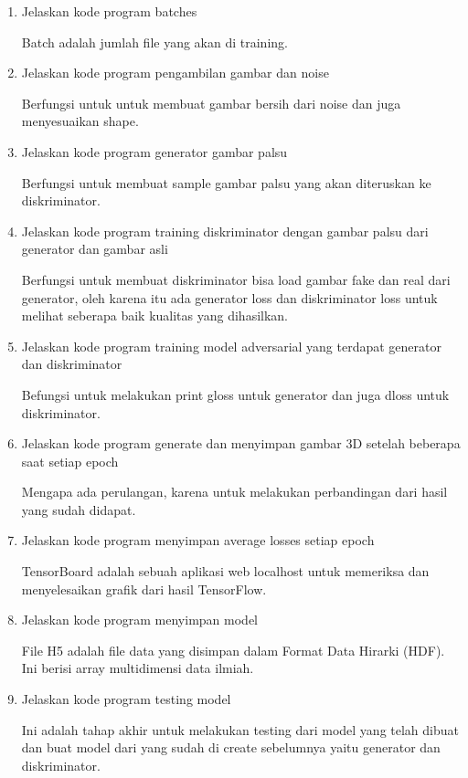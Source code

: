 \begin{enumerate}
\item Jelaskan kode program batches
	
	Batch adalah jumlah file yang akan di training.

\item Jelaskan kode program pengambilan gambar dan noise
	
	Berfungsi untuk untuk membuat gambar bersih dari noise dan juga menyesuaikan shape.

\item Jelaskan kode program generator gambar palsu
	
	Berfungsi untuk membuat sample gambar palsu yang akan diteruskan ke diskriminator.
	
\item Jelaskan kode program training diskriminator dengan gambar palsu dari generator dan gambar asli
	
	Berfungsi untuk membuat diskriminator bisa load gambar fake dan real dari generator, oleh karena itu ada generator loss dan diskriminator loss untuk melihat seberapa baik kualitas yang dihasilkan.

\item Jelaskan kode program training model adversarial yang terdapat generator dan diskriminator

	Befungsi untuk melakukan print gloss untuk generator dan juga dloss untuk diskriminator.

\item Jelaskan kode program  generate dan menyimpan gambar 3D setelah beberapa saat setiap epoch
	
	Mengapa ada perulangan, karena untuk melakukan perbandingan dari hasil yang sudah didapat.

\item Jelaskan kode program  menyimpan average losses setiap epoch
	
	TensorBoard adalah sebuah aplikasi web localhost untuk memeriksa dan menyelesaikan grafik dari hasil TensorFlow.

\item Jelaskan kode program menyimpan model
	
	File H5 adalah file data yang disimpan dalam Format Data Hirarki (HDF). Ini berisi array multidimensi data ilmiah.

\item Jelaskan kode program testing model

	Ini adalah tahap akhir untuk melakukan testing dari model yang telah dibuat dan buat model dari yang sudah di create sebelumnya yaitu generator dan diskriminator.

\end{enumerate}


